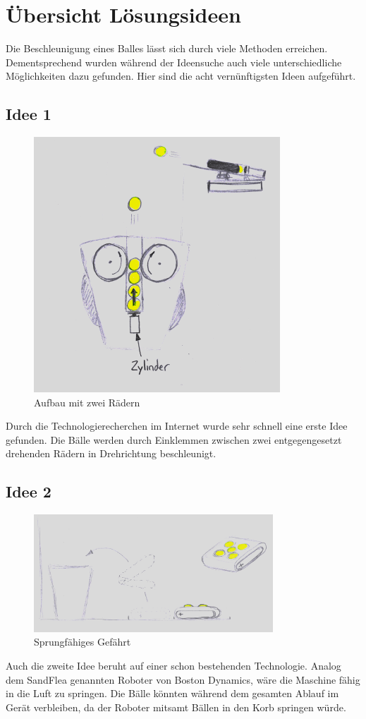 \clearpage
\section{Übersicht Lösungsideen}
Die Beschleunigung eines Balles lässt sich durch viele Methoden erreichen. Dementsprechend wurden während der Ideensuche auch viele unterschiedliche Möglichkeiten dazu gefunden.
Hier sind die acht vernünftigsten Ideen aufgeführt.
\subsection{Idee 1}
\begin{figure}[h!]
	\centering
	\includegraphics[scale=0.75]{../../fig/Wurfmaschine_Drehraeder.png}
	\caption{Aufbau mit zwei Rädern}
	\label{fig:konzept1}
\end{figure}
Durch die Technologierecherchen im Internet wurde sehr schnell eine erste Idee gefunden. Die Bälle werden durch Einklemmen zwischen zwei entgegengesetzt drehenden Rädern in Drehrichtung beschleunigt.

\subsection{Idee 2}
\begin{figure}[h!]
	\centering
	\includegraphics[width=0.8\textwidth]{../../fig/Springer.jpg}
	\caption{Sprungfähiges Gefährt}
	\label{fig:springer}
\end{figure}
Auch die zweite Idee beruht auf einer schon bestehenden Technologie. Analog dem SandFlea
\cite{sandflea} genannten Roboter von Boston Dynamics, wäre die Maschine fähig in die 
Luft zu springen. Die Bälle könnten während dem gesamten Ablauf im Gerät verbleiben, da 
der Roboter mitsamt Bällen in den Korb springen würde.

